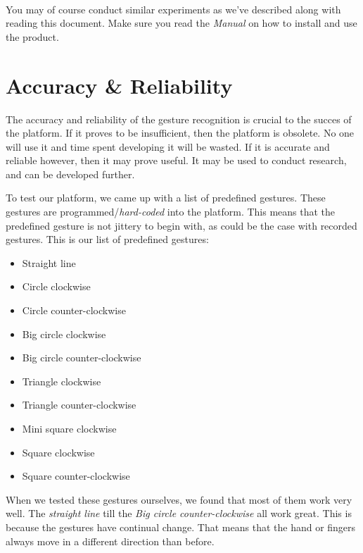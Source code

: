 \documentclass[a4paper]{article}
\providecommand{\tightlist}{%
\setlength{\itemsep}{0pt}\setlength{\parskip}{0pt}}
\begin{document}
  \paragraph{}
  You may of course conduct similar experiments as we've described along with
  reading this document. Make sure you read the \emph{Manual} on how to install
  and use the product.

  \clearpage

  \section*{Accuracy \& Reliability}
  The accuracy and reliability of the gesture recognition is crucial to the
  succes of the platform. If it proves to be insufficient, then the platform is
  obsolete. No one will use it and time spent developing it will be wasted. If
  it is accurate and reliable however, then it may prove useful. It may be used
  to conduct research, and can be developed further.

  To test our platform, we came up with a list of predefined gestures. These
  gestures are programmed/\emph{hard-coded} into the platform. This means that the predefined
  gesture is not jittery to begin with, as could be the case with recorded
  gestures. This is our list of predefined gestures:
  \begin{itemize}
    \tightlist
    \item Straight line
    \item Circle clockwise
    \item Circle counter-clockwise
    \item Big circle clockwise
    \item Big circle counter-clockwise
    \item Triangle clockwise
    \item Triangle counter-clockwise
    \item Mini square clockwise
    \item Square clockwise
    \item Square counter-clockwise
  \end{itemize}

  When we tested these gestures ourselves, we found that most of them work very
  well. The \textit{straight line} till the \textit{Big circle counter-clockwise}
  all work great. This is because the gestures have continual change. That means
  that the hand or fingers always move in a different direction than before.
\end{document}
